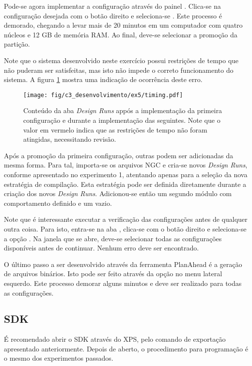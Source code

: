 \documentclass[11pt,a4paper,oneside]{book}
\begin{document}
Pode-se agora implementar a configuração através do painel .
Clica-se na configuração desejada com o botão direito e seleciona-se .
Este processo é demorado, chegando a levar mais de 20 minutos em um computador com quatro núcleos e 12 GB de memória RAM.
Ao final, deve-se selecionar a promoção da partição.

Note que o sistema desenvolvido neste exercício possui restrições de tempo que não puderam ser satisfeitas, mas isto não impede o correto funcionamento do sistema.
A figura \ref{fig:ex5:timing} mostra uma indicação de ocorrência deste erro.

\begin{figure}[htp]
\centering
\texttt{[image: fig/c3\_desenvolvimento/ex5/timing.pdf]}
\caption{Conteúdo da aba \textit{Design Runs} appós a implementação da primeira configuração e durante a implementação das seguintes. Note que o valor em vermelo indica que as restrições de tempo não foram atingidas, necessitando revisão.}
\label{fig:ex5:timing}
\end{figure}

Após a promoção da primeira configuração, outras podem ser adicionadas da mesma forma.
Para tal, importa-se os arquivos NGC e cria-se novos \textit{Design Runs}, conforme apresentado no experimento 1, atentando apenas para a seleção da nova estratégia de compilação.
Esta estratégia pode ser definida diretamente durante a criação dos novos \textit{Design Runs}.
Adicionou-se então um segundo módulo com comportamento definido e um vazio.

Note que é interessante executar a verificação das configurações antes de qualquer outra coisa.
Para isto, entra-se na aba , clica-se com o botão direito e seleciona-se a opção .
Na janela que se abre, deve-se selecionar todas as configurações disponíveis antes de continuar.
Nenhum erro deve ser encontrado.

O último passo a ser desenvolvido através da ferramenta PlanAhead é a geração de arquivos binários.
Isto pode ser feito através da opção  no menu lateral esquerdo.
Este processo demorar alguns minutos e deve ser realizado para todas as configurações.

\subsection{SDK}
É recomendado abrir o SDK através do XPS, pelo comando de exportação apresentado anteriormente.
Depois de aberto, o procedimento para programação é o mesmo dos experimentos passados.
\end{document}
